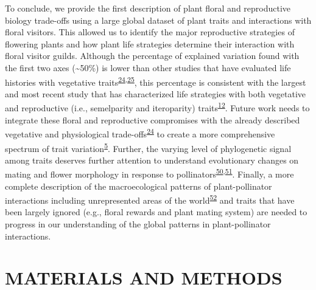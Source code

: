 \documentclass[12pt,a4paper,]{article}
\begin{document}
To conclude, we provide the first description of plant floral and
reproductive biology trade-offs using a large global dataset of plant
traits and interactions with floral visitors. This allowed us to
identify the major reproductive strategies of flowering plants and how
plant life strategies determine their interaction with floral visitor
guilds. Although the percentage of explained variation found with the
first two axes (\textasciitilde{}50\%) is lower than other studies that
have evaluated life histories with vegetative
traits\textsuperscript{\protect\hyperlink{ref-diaz2016}{24},\protect\hyperlink{ref-carmona2021}{25}},
this percentage is consistent with the largest and most recent study
that has characterized life strategies with both vegetative and
reproductive (i.e., semelparity and iteroparity)
traits\textsuperscript{\protect\hyperlink{ref-salguero2016}{12}}. Future
work needs to integrate these floral and reproductive compromises with
the already described vegetative and physiological
trade-offs\textsuperscript{\protect\hyperlink{ref-diaz2016}{24}} to
create a more comprehensive spectrum of trait
variation\textsuperscript{\protect\hyperlink{ref-roddy2021}{5}}.
Further, the varying level of phylogenetic signal among traits deserves
further attention to understand evolutionary changes on mating and
flower morphology in response to
pollinators\textsuperscript{\protect\hyperlink{ref-gervasi2017}{50},\protect\hyperlink{ref-mackin2021}{51}}.
Finally, a more complete description of the macroecological patterns of
plant-pollinator interactions including unrepresented areas of the
world\textsuperscript{\protect\hyperlink{ref-poisot2021}{52}} and traits
that have been largely ignored (e.g., floral rewards and plant mating
system) are needed to progress in our understanding of the global
patterns in plant-pollinator interactions.

\section{MATERIALS AND METHODS}\label{materials-and-methods}
\end{document}

